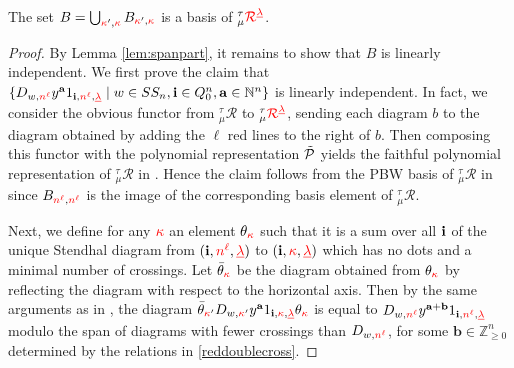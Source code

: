 \begin{theorem}
\label{oklrwbasis}
   The set  $B=\bigcup_{{\color{red}\kappa}',{\color{red}\kappa}}B_{{\color{red}\kappa}',{\color{red}\kappa}}$ 
    is a basis of  ${}^\tau_\mu{{{\color{red}\mathcal{R}}}}^{{{\color{red}\underline{\lambda}}}}$.
\end{theorem}
\begin{proof}By Lemma \ref{lem:spanpart}, it remains to show that $B$ is linearly independent.
  We first prove the claim that $\{D_{w,{\color{red}n^\ell}}y^\mathbf a 1_{\mathbf{i}, {\color{red}n^\ell},{{\color{red}\underline{\lambda}}}} \mid w\in SS_n, \mathbf{i}\in Q_0^n, \mathbf a\in \mathbb{N}^n \}$ is linearly independent.
  In fact, we consider the obvious  functor from 
$ _\mu ^\tau\mathcal R$ to  ${}^\tau_\mu{{{\color{red}\mathcal{R}}}}^{{{\color{red}\underline{\lambda}}}}$, sending each diagram $b$ to the diagram obtained by adding the 
 $\ell$ red lines to the right of $b$.
 Then composing this functor with the polynomial representation $\tilde{\mathcal{P}}$ yields the faithful polynomial representation of $ _\mu ^\tau\mathcal R$ in \cite{Prz23}. Hence the claim follows from the PBW basis of  $ _\mu ^\tau\mathcal R$ in \cite[Proposition 2.9]{Prz23} since $B_{{\color{red}n^\ell},{\color{red}n^\ell}}$ is the image of the corresponding  basis element of $ _\mu ^\tau\mathcal R$.

 Next,  we define for any ${\color{red}\kappa}$ an element $\theta_{\color{red}\kappa}$ such that it is a sum over all $\mathbf{i}$ of the unique   Stendhal  diagram from  $ (\mathbf{i},{\color{red}n^\ell}, {{\color{red}\underline{\lambda}}}  ) $ to $ (\mathbf{i},{\color{red}\kappa}, {{\color{red}\underline{\lambda}}} ) $ which has no dots and a minimal number of crossings. 
 Let $\bar \theta_{\color{red}\kappa}$ be the diagram obtained from $\theta_{\color{red}\kappa}$ by reflecting the diagram with respect to the horizontal axis. Then by the 
 same arguments as in \cite[Lemma 4.17]{Web15}, the diagram $\bar \theta_{{\color{red}\kappa}'}D_{w,{\color{red}\kappa}'}y^{\mathbf{a}} 1_{\mathbf{i},{\color{red}\kappa},{{\color{red}\underline{\lambda}}}} \theta_{\color{red}\kappa}$ is equal to 
 $D_{w,{\color{red}n^\ell}} y^{\mathbf{a}+\mathbf{b}} 1_{\mathbf{i}, {\color{red}n^\ell},{{\color{red}\underline{\lambda}}}} $ modulo the span of diagrams with fewer crossings than $D_{w, {\color{red}n^\ell}}$, for some  $\mathbf{b}\in \mathbb Z_{\ge0}^n$ determined by the relations in \eqref{reddoublecross}.


\end{proof}
